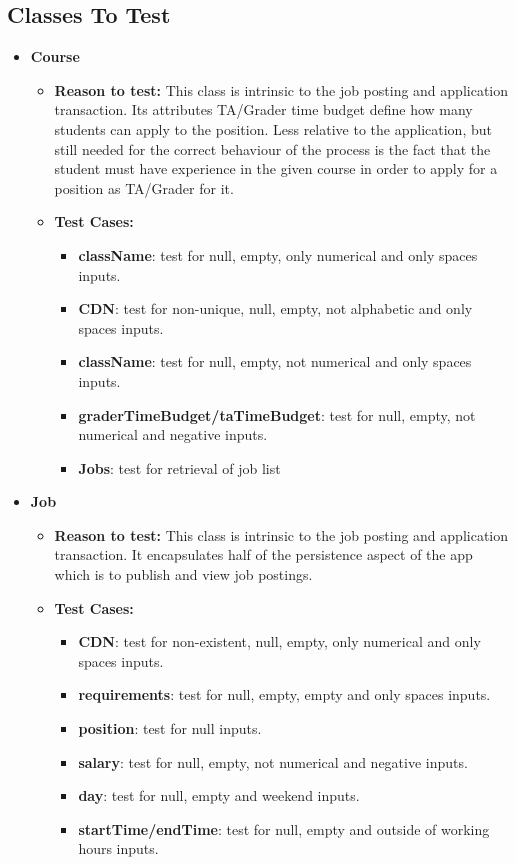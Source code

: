 \documentclass[12pt]{report}
\begin{document}
    \subsection{Classes To Test}
    \begin{itemize}
        \item \textbf{Course}
        \begin{itemize}
            \item \textbf{Reason to test:} This class is intrinsic to the job posting and application transaction. Its attributes TA/Grader time budget define how many students can apply to the position. Less relative to the application, but still needed for the correct behaviour of the process is the fact that the student must have experience in the given course in order to apply for a position as TA/Grader for it.
            \item \textbf{Test Cases:} 
            \begin{itemize}
                \item \textbf{className}: test for null, empty, only numerical and only spaces inputs.
                \item \textbf{CDN}: test for non-unique, null, empty, not alphabetic and only spaces inputs.
                \item \textbf{className}: test for null, empty, not numerical and only spaces inputs.
                \item \textbf{graderTimeBudget/taTimeBudget}: test for null, empty, not numerical and negative inputs.
                \item \textbf{Jobs}: test for retrieval of job list
            \end{itemize}
        \end{itemize}
        
        \item \textbf{Job}
        \begin{itemize}
            \item \textbf{Reason to test:} This class is intrinsic to the job posting and application transaction. It encapsulates half of the persistence aspect of the app which is to publish and view job postings.
            \item \textbf{Test Cases:} 
            \begin{itemize}
                \item \textbf{CDN}: test for non-existent, null, empty, only numerical and only spaces inputs.
                \item \textbf{requirements}: test for null, empty, empty and only spaces inputs.
                \item \textbf{position}: test for null inputs.
                \item \textbf{salary}: test for null, empty, not numerical and negative inputs.
                \item \textbf{day}: test for null, empty and weekend inputs.
               \item \textbf{startTime/endTime}: test for null, empty and outside of working hours inputs.
            \end{itemize}
        \end{itemize}
        

\end{itemize}
\end{document}
